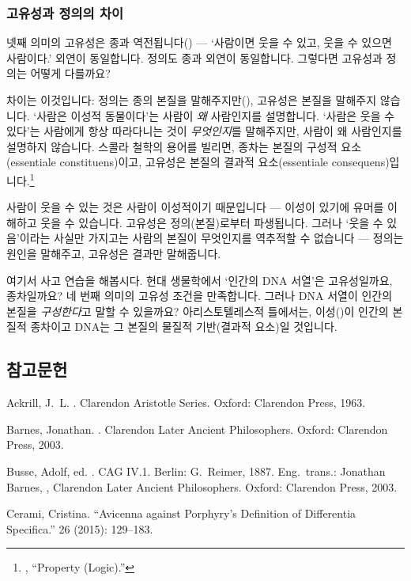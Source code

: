 \documentclass[12pt, a4paper]{article}
\begin{document}
\subsubsection{고유성과 정의의 차이}

넷째 의미의 고유성은 종과 역전됩니다() --- `사람이면 웃을 수 있고, 웃을 수 있으면 사람이다.' 외연이 동일합니다. 정의도 종과 외연이 동일합니다. 그렇다면 고유성과 정의는 어떻게 다를까요?

차이는 이것입니다: 정의는 종의 본질을 말해주지만(), 고유성은 본질을 말해주지 않습니다. `사람은 이성적 동물이다'는 사람이 \emph{왜} 사람인지를 설명합니다. `사람은 웃을 수 있다'는 사람에게 항상 따라다니는 것이 \emph{무엇인지}를 말해주지만, 사람이 왜 사람인지를 설명하지 않습니다. 스콜라 철학의 용어를 빌리면, 종차는 본질의 구성적 요소(essentiale constituens)이고, 고유성은 본질의 결과적 요소(essentiale consequens)입니다.\footnote{, ``Property (Logic).''}

사람이 웃을 수 있는 것은 사람이 이성적이기 때문입니다 --- 이성이 있기에 유머를 이해하고 웃을 수 있습니다. 고유성은 정의(본질)로부터 파생됩니다. 그러나 `웃을 수 있음'이라는 사실만 가지고는 사람의 본질이 무엇인지를 역추적할 수 없습니다 --- 정의는 원인을 말해주고, 고유성은 결과만 말해줍니다.

여기서 사고 연습을 해봅시다. 현대 생물학에서 `인간의 DNA 서열'은 고유성일까요, 종차일까요? 네 번째 의미의 고유성 조건을 만족합니다. 그러나 DNA 서열이 인간의 본질을 \emph{구성한다}고 말할 수 있을까요? 아리스토텔레스적 틀에서는, 이성()이 인간의 본질적 종차이고 DNA는 그 본질의 물질적 기반(결과적 요소)일 것입니다.

\subsection*{참고문헌}
\begin{references}

 Ackrill, J.\ L. . Clarendon Aristotle Series. Oxford: Clarendon Press, 1963.

 Barnes, Jonathan. . Clarendon Later Ancient Philosophers. Oxford: Clarendon Press, 2003.

 Busse, Adolf, ed. . CAG IV.1. Berlin: G.\ Reimer, 1887. Eng.\ trans.: Jonathan Barnes, , Clarendon Later Ancient Philosophers. Oxford: Clarendon Press, 2003.

 Cerami, Cristina. ``Avicenna against Porphyry's Definition of Differentia Specifica.''  26 (2015): 129--183.

\end{references}
\end{document}
